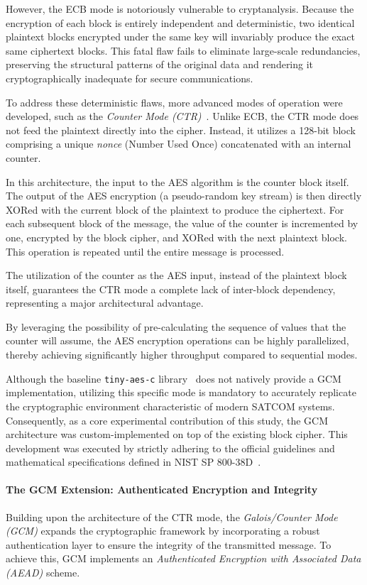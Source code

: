 \documentclass[11pt,a4paper]{report}
\begin{document}
However, the ECB mode is notoriously vulnerable to cryptanalysis. Because the encryption of each block is entirely independent and deterministic, two identical plaintext blocks encrypted under the same key will invariably produce the exact same ciphertext blocks. 
This fatal flaw fails to eliminate large-scale redundancies, preserving the structural patterns of the original data and rendering it cryptographically inadequate for secure communications. 

To address these deterministic flaws, more advanced modes of operation were developed, such as the \textit{Counter Mode (CTR)}~\cite[p. 15--16]{ECB_CTR}. 
Unlike ECB, the CTR mode does not feed the plaintext directly into the cipher. Instead, it utilizes a 128-bit block comprising a unique \textit{nonce} (Number Used Once) concatenated with an internal counter.

In this architecture, the input to the AES algorithm is the counter block itself. 
The output of the AES encryption (a pseudo-random key stream) is then directly XORed with the current block of the plaintext to produce the ciphertext. 
For each subsequent block of the message, the value of the counter is incremented by one, encrypted by the block cipher, and XORed with the next plaintext block.
This operation is repeated until the entire message is processed.

The utilization of the counter as the AES input, instead of the plaintext block itself, guarantees the CTR mode a complete lack of inter-block dependency, representing a major architectural advantage.

By leveraging the possibility of pre-calculating the sequence of values that the counter will assume, the AES encryption operations can be highly parallelized, 
thereby achieving significantly higher throughput compared to sequential modes.

Although the baseline \texttt{tiny-aes-c} library~\cite{tinyAES} does not natively provide a GCM implementation, utilizing this specific mode is mandatory to accurately replicate the cryptographic environment characteristic of modern SATCOM systems. 
Consequently, as a core experimental contribution of this study, the GCM architecture was custom-implemented on top of the existing block cipher. 
This development was executed by strictly adhering to the official guidelines and mathematical specifications defined in NIST SP 800-38D~\cite{GCM}.

\paragraph{The GCM Extension: Authenticated Encryption and Integrity}
Building upon the architecture of the CTR mode, the \textit{Galois/Counter Mode (GCM)} expands the cryptographic framework by incorporating a robust authentication layer to ensure the integrity of the transmitted message. 
To achieve this, GCM implements an \textit{Authenticated Encryption with Associated Data (AEAD)} scheme.
\end{document}
